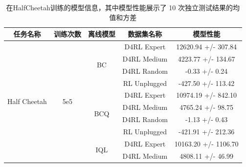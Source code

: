 \begin{table}[!ht]
    \small
    \centering
    \caption{
        在HalfCheetah训练的模型信息，其中模型性能展示了 10 次独立测试结果的均值和方差
        }
    \label{tab:details of the models trained on the halfcheetah dataset}
    \centering
    \begin{tabular}{ccccc}
    \toprule
    \textbf{任务名称}           & \textbf{训练次数}   & \textbf{离线模型}     & \textbf{数据集名称} & \textbf{模型性能} \\ \hline
    \multirow{16}{*}{Half Cheetah} & \multirow{16}{*}{5e5} & \multirow{4}{*}{BC}        & D4RL   Expert        & 12620.94 +/- 307.84        \\
                                   &                       &                            & D4RL   Medium        & 4223.77 +/- 134.67         \\
                                   &                       &                            & D4RL   Random        & -0.33 +/- 0.24             \\
                                   &                       &                            & RL Unplugged         & -427.50 +/- 113.42         \\ \cline{3-5} 
                                   &                       & \multirow{4}{*}{BCQ}       & D4RL   Expert        & 10974.19 +/- 842.10        \\
                                   &                       &                            & D4RL   Medium        & 4765.24 +/- 98.75          \\
                                   &                       &                            & D4RL   Random        & -1.13 +/- 0.43             \\
                                   &                       &                            & RL Unplugged         & -421.91 +/- 212.36         \\ \cline{3-5} 
                                   &                       & \multirow{4}{*}{IQL}       & D4RL   Expert        & 10163.20 +/- 1106.70       \\
                                   &                       &                            & D4RL   Medium        & 4808.11 +/- 46.99          \\

\end{tabular}
\end{table}
